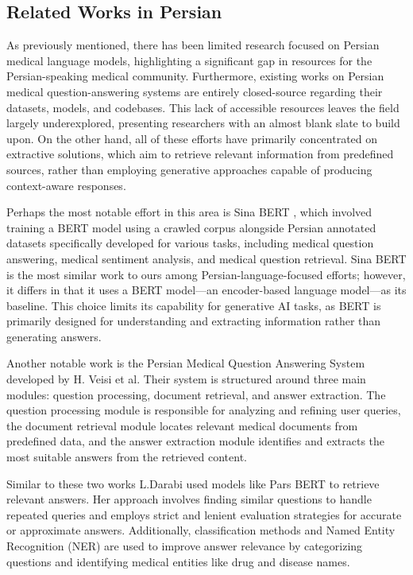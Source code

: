 \documentclass[conference]{IEEEtran}
\begin{document}
\subsection{Related Works in Persian}
As previously mentioned, there has been limited research focused on Persian medical language models, highlighting a significant gap in resources for the Persian-speaking medical community. Furthermore, existing works on Persian medical question-answering systems are entirely closed-source regarding their datasets, models, and codebases. This lack of accessible resources leaves the field largely underexplored, presenting researchers with an almost blank slate to build upon. On the other hand, all of these efforts have primarily concentrated on extractive solutions, which aim to retrieve relevant information from predefined sources, rather than employing generative approaches capable of producing context-aware responses.

Perhaps the most notable effort in this area is Sina BERT \cite{b4}, which involved training a BERT model using a crawled corpus alongside Persian annotated datasets specifically developed for various tasks, including medical question answering, medical sentiment analysis, and medical question retrieval. Sina BERT is the most similar work to ours among Persian-language-focused efforts; however, it differs in that it uses a BERT model—an encoder-based language model—as its baseline. This choice limits its capability for generative AI tasks, as BERT is primarily designed for understanding and extracting information rather than generating answers.

Another notable work is the Persian Medical Question Answering System developed by H. Veisi et al.
\cite{b11}
Their system is structured around three main modules: question processing, document retrieval, and answer extraction. The question processing module is responsible for analyzing and refining user queries, the document retrieval module locates relevant medical documents from predefined data, and the answer extraction module identifies and extracts the most suitable answers from the retrieved content.

Similar to these two works L.Darabi
\cite{b12}
used models like Pars BERT
\cite{b13}
to retrieve relevant answers. Her approach involves finding similar questions to handle repeated queries and employs strict and lenient evaluation strategies for accurate or approximate answers. Additionally, classification methods and Named Entity Recognition (NER) are used to improve answer relevance by categorizing questions and identifying medical entities like drug and disease names.
\end{document}
